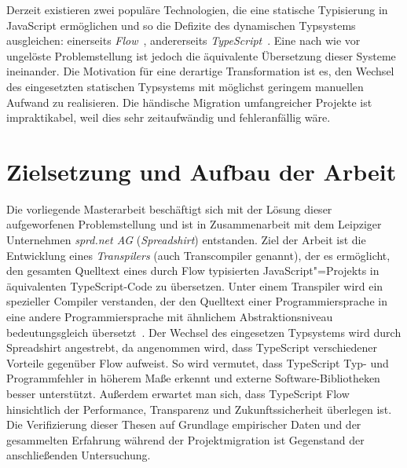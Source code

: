 Derzeit existieren zwei populäre Technologien, die eine statische Typisierung in JavaScript ermöglichen und so die Defizite des dynamischen Typsystems ausgleichen: einerseits \textit{Flow}~\autocite{FLOW:PAPER}, andererseits \textit{TypeScript}~\autocite{TYPESCRIPT:SPEC}. Eine nach wie vor ungelöste Problemstellung ist jedoch die äquivalente Übersetzung dieser Systeme ineinander. Die Motivation für eine derartige Transformation ist es, den Wechsel des eingesetzten statischen Typsystems mit möglichst geringem manuellen Aufwand zu realisieren. Die händische Migration umfangreicher Projekte ist impraktikabel, weil dies sehr zeitaufwändig und fehleranfällig wäre.

\enlargethispage{\baselineskip}
\vspace*{-0.5\baselineskip}

\section{Zielsetzung und Aufbau der Arbeit}

\vspace*{-0.5\baselineskip}
Die vorliegende Masterarbeit beschäftigt sich mit der Lösung dieser aufgeworfenen Problemstellung und ist in Zusammenarbeit mit dem Leipziger Unternehmen \textit{sprd.net AG} (\textit{Spreadshirt}) entstanden. Ziel der Arbeit ist die Entwicklung eines \emph{Transpilers} (auch Transcompiler genannt), der es ermöglicht, den gesamten Quelltext eines durch Flow typisierten JavaScript"=Projekts in äquivalenten TypeScript-Code zu übersetzen. Unter einem Transpiler wird ein spezieller Compiler verstanden, der den Quelltext einer Programmiersprache in eine andere Programmiersprache mit ähnlichem Abstraktionsniveau bedeutungsgleich übersetzt~\autocite{EVGENIY:2016}. Der Wechsel des eingesetzen Typsystems wird durch Spreadshirt angestrebt, da angenommen wird, dass TypeScript verschiedener Vorteile gegenüber Flow aufweist. So wird vermutet, dass TypeScript Typ- und Programmfehler in höherem Maße erkennt und externe Software-Bibliotheken besser unterstützt. Außerdem erwartet man sich, dass TypeScript Flow hinsichtlich der Performance, Transparenz und Zukunftssicherheit überlegen ist. Die Verifizierung dieser Thesen auf Grundlage empirischer Daten und der gesammelten Erfahrung während der Projektmigration ist Gegenstand der anschließenden Untersuchung.


